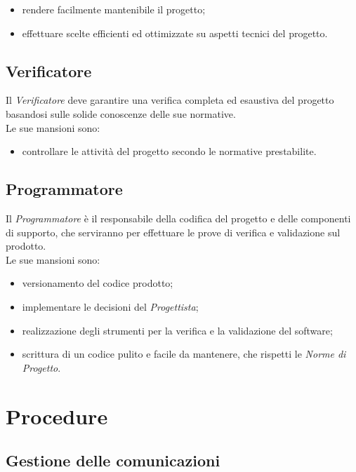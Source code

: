 \documentclass[../NormediProgetto.tex]{subfiles}
\begin{document}
	\begin{itemize}
		\item rendere facilmente mantenibile il progetto;
		\item effettuare scelte efficienti ed ottimizzate su aspetti tecnici del progetto.
	\end{itemize}
	
	\subsection {Verificatore}
	
	Il \textit{Verificatore} deve garantire una verifica completa ed esaustiva del progetto basandosi sulle solide conoscenze delle sue normative.
	\\ \noindent Le sue mansioni sono:
	\begin{itemize}
		\item controllare le attività del progetto secondo le normative prestabilite.
	\end{itemize}
	
	\subsection {Programmatore}
	
	Il \textit{Programmatore} è il responsabile della codifica del progetto e delle componenti di supporto, che serviranno per effettuare le prove di verifica e validazione sul prodotto.
	\\ \noindent Le sue mansioni sono:
	
	\begin{itemize}
		\item versionamento del codice prodotto;
		\item implementare le decisioni del \textit{Progettista};
		\item realizzazione degli strumenti per la verifica e la validazione del software;
		\item scrittura di un codice pulito e facile da mantenere, che rispetti le \textit{Norme di Progetto}.
	\end{itemize}
	
	\section {Procedure}
	
	\subsection{Gestione delle comunicazioni}
	
\end{document}
